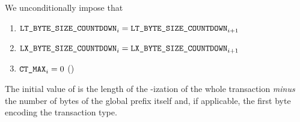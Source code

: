 \begin{center}
\end{center}

We unconditionally impose that
\begin{enumerate}
	\item $\texttt{LT\_BYTE\_SIZE\_COUNTDOWN} _{i} = \texttt{LT\_BYTE\_SIZE\_COUNTDOWN} _{i + 1}$
	\item $\texttt{LX\_BYTE\_SIZE\_COUNTDOWN} _{i} = \texttt{LX\_BYTE\_SIZE\_COUNTDOWN} _{i + 1}$
	\item $\texttt{CT\_MAX}    _{i} = 0$  \quad (\sanityCheck)
\end{enumerate}
\saNote{}
The initial value of \ltByteSizeCountDown{}
is the length of the \rlp{}-ization of the whole transaction \emph{minus}
the number of bytes of the global \rlp{} prefix itself and,
if applicable, the first byte encoding the transaction type.

